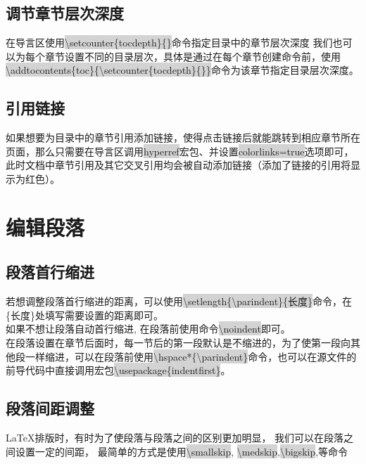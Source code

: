 \documentclass[a4paper,twoside,12pt]{article}
\begin{document}
\subsection[层次别名]{调节章节层次深度}
在导言区使用\colorbox{lightgray}{\textbackslash setcounter\{tocdepth\}\{\}}命令指定目录中的章节层次深度
我们也可以为每个章节设置不同的目录层次，具体是通过在每个章节创建命令前，使用\\ \colorbox{lightgray}{\textbackslash addtocontents\{toc\}\{\textbackslash setcounter\{tocdepth\}\{\}\}}命令为该章节指定目录层次深度。
\subsection{引用链接}
如果想要为目录中的章节引用添加链接，使得点击链接后就能跳转到相应章节所在页面，那么只需要在导言区调用\colorbox{lightgray}{hyperref}宏包、并设置\colorbox{lightgray}{colorlinks=true}选项即可，此时文档中章节引用及其它交叉引用均会被自动添加链接（添加了链接的引用将显示为红色）。

\section{编辑段落}
\subsection{段落首行缩进}
\setlength{\parindent}{4em}
若想调整段落首行缩进的距离，可以使用\colorbox{lightgray}{\textbackslash setlength\{\textbackslash parindent\}\{长度\}}命令，在\{长度\}处填写需要设置的距离即可。\\
\noindent
如果不想让段落自动首行缩进, 在段落前使用命令\colorbox{lightgray}{\textbackslash noindent}即可。\\
\setlength{\parindent}{2em}
在段落设置在章节后面时，每一节后的第一段默认是不缩进的，为了使第一段向其他段一样缩进，可以在段落前使用\colorbox{lightgray}{\textbackslash hspace*\{\textbackslash parindent\}}命令，也可以在源文件的前导代码中直接调用宏包\colorbox{lightgray}{\textbackslash usepackage\{indentfirst\}}。
\subsection{段落间距调整}
LaTeX排版时，有时为了使段落与段落之间的区别更加明显，
\smallskip
我们可以在段落之间设置一定的间距，
\medskip
最简单的方式是使用\colorbox{lightgray}{\textbackslash smallskip},
\bigskip
\colorbox{lightgray}{\textbackslash medskip},\colorbox{lightgray}{\textbackslash bigskip},等命令
\end{document}
